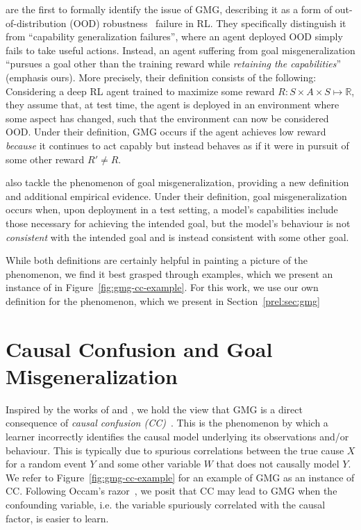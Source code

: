 \documentclass[../main.tex]{subfiles}
\begin{document}
 are the first to formally identify the issue of GMG, describing it as
a form of out-of-distribution (OOD) robustness~\citep{arjovsky_out_2020} failure in RL. They
specifically distinguish it from ``capability generalization failures'', where an agent deployed OOD
simply fails to take useful actions. Instead, an agent suffering from goal misgeneralization
``pursues a goal other than the training reward while \emph{retaining the capabilities}'' (emphasis
ours). More precisely, their definition consists of the following: Considering a deep RL agent
trained to maximize some reward $R: S \times A \times S \mapsto \mathbb{R}$, they assume that, at
test time, the agent is deployed in an environment where some aspect has changed, such that the
environment can now be considered OOD. Under their definition, GMG occurs if the agent achieves low
reward \emph{because} it continues to act capably but instead behaves as if it were in pursuit of
some other reward $R' \neq R$.

 also tackle the phenomenon of goal misgeneralization, providing a new
definition and additional empirical evidence. Under their definition, goal misgeneralization occurs
when, upon deployment in a test setting, a model's capabilities include those necessary for
achieving the intended goal, but the model's behaviour is not \emph{consistent} with the intended
goal and is instead consistent with some other goal.

While both definitions are certainly helpful in painting a picture of the phenomenon, we find it
best grasped through examples, which we present an instance of in Figure~\ref{fig:gmg-cc-example}.
For this work, we use our own definition for the phenomenon, which we present in
Section~\ref{prel:sec:gmg}

\section{Causal Confusion and Goal Misgeneralization}

Inspired by the works of \citet{gupta_can_2022} and \citet{kirk_causal_2022}, we hold the view that
GMG is a direct consequence of \emph{causal confusion (CC)}~\citep{de_haan_causal_2019}. This is the
phenomenon by which a learner incorrectly identifies the causal model underlying its observations
and/or behaviour. This is typically due to spurious correlations between the true cause $X$ for
a random event $Y$ and some other variable $W$ that does not causally model $Y$. We refer to
Figure~\ref{fig:gmg-cc-example} for an example of GMG as an instance of CC. Following Occam's
razor~\citep{ariew_ockhams_1976, blumer_occams_1987}, we posit that CC may lead to GMG when the
confounding variable, i.e. the variable spuriously correlated with the causal factor, is easier to
learn.
\end{document}
